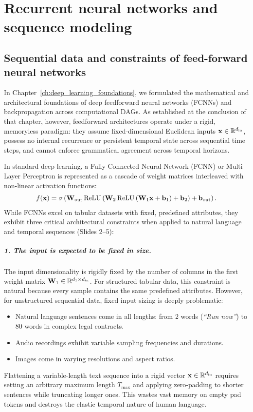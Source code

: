 \documentclass[../../main.tex]{subfiles}
\begin{document}
\chapter{Recurrent neural networks and sequence modeling}
\label{ch:rnn_sequence_modeling}

\section{Sequential data and constraints of feed-forward neural networks}
\label{sec:fcnn_limits}

In Chapter~\ref{ch:deep_learning_foundations}, we formulated the mathematical and architectural foundations of deep feedforward neural networks (FCNNs) and backpropagation across computational DAGs. As established at the conclusion of that chapter, however, feedforward architectures operate under a rigid, memoryless paradigm: they assume fixed-dimensional Euclidean inputs $\mathbf{x} \in \mathbb{R}^{d_{\text{in}}}$, possess no internal recurrence or persistent temporal state across sequential time steps, and cannot enforce grammatical agreement across temporal horizons.

In standard deep learning, a Fully-Connected Neural Network (FCNN) or Multi-Layer Perceptron is represented as a cascade of weight matrices interleaved with non-linear activation functions:
\begin{equation}
\label{eq:fcnn_cascade}
f(\mathbf{x}) = \sigma\left( \mathbf{W}_{\text{out}} \operatorname{\mathrm{ReLU}}\left( \mathbf{W}_2 \operatorname{\mathrm{ReLU}}\left( \mathbf{W}_1 \mathbf{x} + \mathbf{b}_1 \right) + \mathbf{b}_2 \right) + \mathbf{b}_{\text{out}} \right).
\end{equation}
While FCNNs excel on tabular datasets with fixed, predefined attributes, they exhibit three critical architectural constraints when applied to natural language and temporal sequences (Slides 2--5):

\paragraph{1. The input is expected to be fixed in size.}
The input dimensionality is rigidly fixed by the number of columns in the first weight matrix $\mathbf{W}_1 \in \mathbb{R}^{d_1 \times d_{\text{in}}}$. For structured tabular data, this constraint is natural because every sample contains the same predefined attributes. However, for unstructured sequential data, fixed input sizing is deeply problematic:
\begin{itemize}
    \item Natural language sentences come in all lengths: from 2 words (\textit{``Run now''}) to 80 words in complex legal contracts.
    \item Audio recordings exhibit variable sampling frequencies and durations.
    \item Images come in varying resolutions and aspect ratios.
\end{itemize}
Flattening a variable-length text sequence into a rigid vector $\mathbf{x} \in \mathbb{R}^{d_{\text{in}}}$ requires setting an arbitrary maximum length $T_{\max}$ and applying zero-padding to shorter sentences while truncating longer ones. This wastes vast memory on empty pad tokens and destroys the elastic temporal nature of human language.
\end{document}
